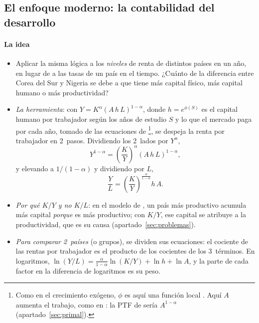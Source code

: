 \documentclass[11pt]{article}
\begin{document}
\subsection{El enfoque moderno: la contabilidad del desarrollo}\label{sec:desarrollo}

\paragraph{La idea}

\begin{itemize}
\item Aplicar la misma lógica a los \emph{niveles} de renta de distintos países en un año, en lugar de a las tasas de un país en el tiempo. ¿Cuánto de la diferencia entre Corea del Sur y Nigeria se debe a que tiene más capital físico, más capital humano o más productividad?
\item \emph{La herramienta}: con $Y=K^{\alpha}(A\,h\,L)^{1-\alpha}$, donde $h=e^{\phi(S)}$ es el capital humano por trabajador según los años de estudio $S$ y lo que el mercado paga por cada año, tomado de las ecuaciones de  \footnote{Como en el crecimiento exógeno, $\phi$ es aquí una función local . Aquí $A$ aumenta el trabajo, como en \textcite{HallJones1999Why}: la PTF de  sería $A^{1-\alpha}$ (apartado~\ref{sec:primal}).}, se despeja la renta por trabajador en 2~pasos. Dividiendo los 2~lados por $Y^{\alpha}$,
  \[
  Y^{1-\alpha}=\left(\frac{K}{Y}\right)^{\alpha}(A\,h\,L)^{1-\alpha},
  \]
  y elevando a $1/(1-\alpha)$ y dividiendo por $L$,
  \begin{equation}
  \frac{Y}{L}=\left(\frac{K}{Y}\right)^{\frac{\alpha}{1-\alpha}}h\,A .\label{eq:hall-jones}
  \end{equation}
\item \emph{Por qué $K/Y$ y no $K/L$}: en el modelo de , un país más productivo acumula más capital \emph{porque} es más productivo; con $K/Y$, ese capital se atribuye a la productividad, que es su causa (apartado~\ref{sec:problemas})\nocite{KlenowRodriguezClare1997Neoclassical,HallJones1999Why}.
\item \emph{Para comparar 2~países} (o grupos), se dividen sus ecuaciones: el cociente de las rentas por trabajador es el producto de los cocientes de los 3~términos. En logaritmos, $\ln(Y/L)=\frac{\alpha}{1-\alpha}\ln(K/Y)+\ln h+\ln A$, y la parte de cada factor en la diferencia de logaritmos es su peso.
\end{itemize}
\end{document}
